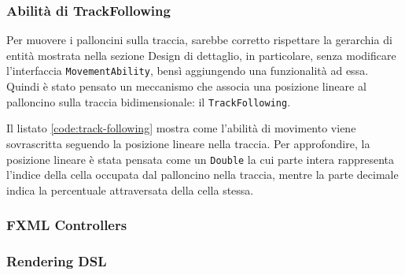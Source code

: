 

\subsubsection{Abilità di TrackFollowing}
Per muovere i palloncini sulla traccia, sarebbe corretto rispettare la gerarchia di entità mostrata nella sezione
Design di dettaglio, in particolare, senza modificare l'interfaccia \texttt{MovementAbility}, bensì aggiungendo una
funzionalità ad essa. Quindi è stato pensato un meccanismo che associa una posizione lineare al palloncino sulla
traccia bidimensionale: il \texttt{TrackFollowing}.



Il listato \ref{code:track-following} mostra come l'abilità di movimento viene sovrascritta seguendo la posizione
lineare nella traccia. Per approfondire, la posizione lineare è stata pensata come un \texttt{Double} la cui parte
intera rappresenta l'indice della cella occupata dal palloncino nella traccia, mentre la parte decimale indica la
percentuale attraversata della cella stessa.

\subsubsection{FXML Controllers}
\subsubsection{Rendering DSL}


